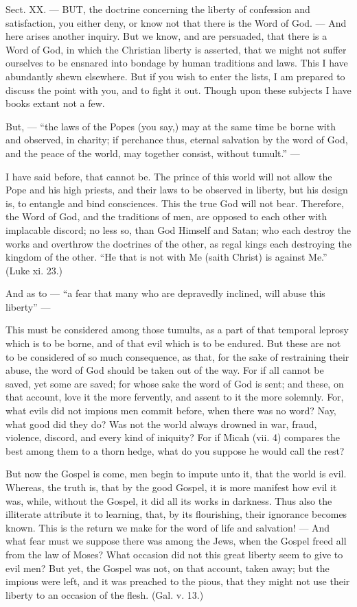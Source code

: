 
Sect. XX. — BUT, the doctrine concerning the liberty of confession and satisfaction, you either deny, or know not that there is the Word of God. — And here arises another inquiry. But we know, and are persuaded, that there is a Word of God, in which the Christian liberty is asserted, that we might not suffer ourselves to be ensnared into bondage by human traditions and laws. This I have abundantly shewn elsewhere. But if you wish to enter the lists, I am prepared to discuss the point with you, and to fight it out. Though upon these subjects I have books extant not a few.

But, — “the laws of the Popes (you say,) may at the same time be borne with and observed, in charity; if perchance thus, eternal salvation by the word of God, and the peace of the world, may together consist, without tumult.” —

I have said before, that cannot be. The prince of this world will not allow the Pope and his high priests, and their laws to be observed in liberty, but his design is, to entangle and bind consciences. This the true God will not bear. Therefore, the Word of God, and the traditions of men, are opposed to each other with implacable discord; no less so, than God Himself and Satan; who each destroy the works and overthrow the doctrines of the other, as regal kings each destroying the kingdom of the other. “He that is not with Me (saith Christ) is against Me.” (Luke xi. 23.)

And as to — “a fear that many who are depravedly inclined, will abuse this liberty” —

This must be considered among those tumults, as a part of that temporal leprosy which is to be borne, and of that evil which is to be endured. But these are not to be considered of so much consequence, as that, for the sake of restraining their abuse, the word of God should be taken out of the way. For if all cannot be saved, yet some are saved; for whose sake the word of God is sent; and these, on that account, love it the more fervently, and assent to it the more solemnly. For, what evils did not impious men commit before, when there was no word? Nay, what good did they do? Was not the world always drowned in war, fraud, violence, discord, and every kind of iniquity? For if Micah (vii. 4) compares the best among them to a thorn hedge, what do you suppose he would call the rest?

But now the Gospel is come, men begin to impute unto it, that the world is evil. Whereas, the truth is, that by the good Gospel, it is more manifest how evil it was, while, without the Gospel, it did all its works in darkness. Thus also the illiterate attribute it to learning, that, by its flourishing, their ignorance becomes known. This is the return we make for the word of life and salvation! — And what fear must we suppose there was among the Jews, when the Gospel freed all from the law of Moses? What occasion did not this great liberty seem to give to evil men? But yet, the Gospel was not, on that account, taken away; but the impious were left, and it was preached to the pious, that they might not use their liberty to an occasion of the flesh. (Gal. v. 13.)

